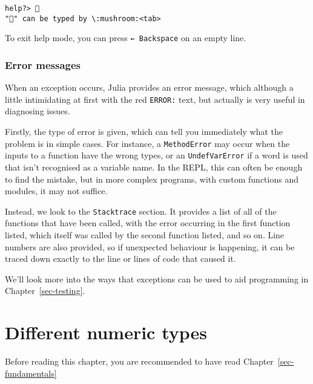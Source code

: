 \documentclass[
  letterpaper,
  DIV=11,
  numbers=noendperiod]{scrreprt}
\begin{document}
\begin{verbatim}
help?> 🍄
"🍄" can be typed by \:mushroom:<tab>
\end{verbatim}

To exit help mode, you can press \texttt{←\ Backspace} on an empty line.

\hypertarget{error-messages}{%
\subsection{Error messages}\label{error-messages}}

When an exception occurs, Julia provides an error message, which
although a little intimidating at first with the red \texttt{ERROR:}
text, but actually is very useful in diagnosing issues.

Firstly, the type of error is given, which can tell you immediately what
the problem is in simple cases. For instance, a \texttt{MethodError} may
occur when the inputs to a function have the wrong types, or an
\texttt{UndefVarError} if a word is used that isn't recognised as a
variable name. In the REPL, this can often be enough to find the
mistake, but in more complex programs, with custom functions and
modules, it may not suffice.

Instead, we look to the \texttt{Stacktrace} section. It provides a list
of all of the functions that have been called, with the error occurring
in the first function listed, which itself was called by the second
function listed, and so on. Line numbers are also provided, so if
unexpected behaviour is happening, it can be traced down exactly to the
line or lines of code that caused it.

We'll look more into the ways that exceptions can be used to aid
programming in Chapter~\ref{sec-testing}.

\hypertarget{sec-numerictypes}{%
\chapter{Different numeric types}\label{sec-numerictypes}}

\begin{tcolorbox}[enhanced jigsaw, toprule=.15mm, opacitybacktitle=0.6, leftrule=.75mm, breakable, coltitle=black, bottomrule=.15mm, colbacktitle=quarto-callout-important-color!10!white, bottomtitle=1mm, rightrule=.15mm, title=\textcolor{quarto-callout-important-color}{\faExclamation}\hspace{0.5em}{Prerequisites}, colframe=quarto-callout-important-color-frame, left=2mm, colback=white, opacityback=0, arc=.35mm, toptitle=1mm, titlerule=0mm]

Before reading this chapter, you are recommended to have read
Chapter~\ref{sec-fundamentals}

\end{tcolorbox}
\end{document}
